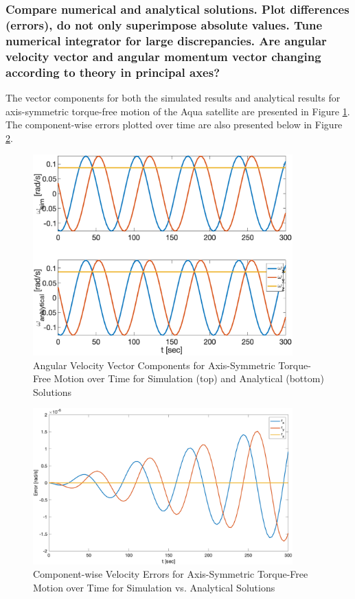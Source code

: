 \subsubsection{Compare numerical and analytical solutions. Plot differences (errors), do not only superimpose absolute values. Tune numerical integrator for large discrepancies. Are angular velocity vector and angular momentum vector changing according to theory in principal axes?}

The vector components for both the simulated results and analytical results for axis-symmetric torque-free motion of the Aqua satellite are presented in Figure \ref{fig:axis_symmetric_magnitudes}. The component-wise errors plotted over time are also presented below in Figure \ref{fig:axis_symmetric_errors}. 

\begin{figure} [H]
    \centering
    \captionsetup{justification = centering}
    \includegraphics[width = 10cm] {Images/sim_vs_anlt_magnitude.png}
    \caption{Angular Velocity Vector Components for Axis-Symmetric Torque-Free Motion over Time for Simulation (top) and Analytical (bottom) Solutions}
    \label{fig:axis_symmetric_magnitudes}
\end{figure}

\begin{figure} [H]
    \centering
    \captionsetup{justification = centering}
    \includegraphics[width = 10cm] {Images/sim_vs_anlt_error.png}
    \caption{Component-wise Velocity Errors for Axis-Symmetric Torque-Free Motion over Time for Simulation vs. Analytical Solutions}
    \label{fig:axis_symmetric_errors}
\end{figure}


